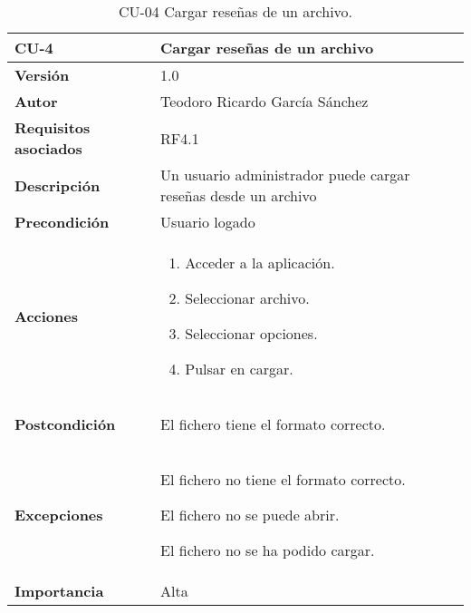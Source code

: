 \begin{table}[p]
	\centering
	\begin{tabularx}{\linewidth}{ p{} p{} }
		\toprule
		\textbf{CU-4}    & \textbf{Cargar reseñas de un archivo}\\
		\toprule
		\textbf{Versión}              & 1.0    \\
		\textbf{Autor}                & Teodoro Ricardo García Sánchez \\
		\textbf{Requisitos asociados} & RF4.1 \\
		\textbf{Descripción}          & Un usuario administrador puede cargar reseñas desde un archivo \\
		\textbf{Precondición}         & Usuario logado \\
		\textbf{Acciones}             &
		\begin{enumerate}
			\def\labelenumi{\arabic{enumi}.}
			\tightlist
			\item Acceder a la aplicación.
			\item Seleccionar archivo.
			\item Seleccionar opciones.
			\item Pulsar en cargar.
		\end{enumerate}\\
		\textbf{Postcondición}        & 
		\begin{list}
			\tightlist
			\item El fichero tiene el formato correcto.
		\end{list}\\
		\textbf{Excepciones}          & 
		\begin{list}
			\tightlist
			\item El fichero no tiene el formato correcto.
			\item El fichero no se puede abrir.
			\item El fichero no se ha podido cargar. 
		\end{list}\\
		\textbf{Importancia}          & Alta \\
		\bottomrule
	\end{tabularx}
	\caption{CU-04 Cargar reseñas de un archivo.}
\end{table}
